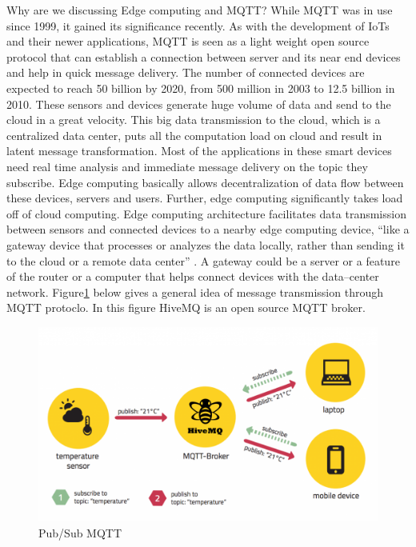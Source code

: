 \documentclass[sigconf]{acmart}
\begin{document}
Why are we discussing Edge computing and MQTT? While MQTT was in use since 1999, it gained its significance recently. As with the development of IoTs and their newer applications, MQTT is seen as a light weight open source protocol that can establish a connection between server and its near end devices and help in quick message delivery. The number of connected devices are expected to reach 50 billion by 2020, from 500 million in 2003 to 12.5 billion in 2010. These sensors and devices generate huge volume of data and send to the cloud in a great velocity. This big data transmission to the cloud, which is a centralized data center, puts all the computation load on cloud and result in latent message transformation. Most of the applications in these smart devices need real time analysis and immediate message delivery on the topic they subscribe. Edge computing basically allows decentralization of data flow between these devices, servers and users. Further, edge computing significantly takes load off of cloud computing. Edge computing architecture facilitates data transmission between sensors and connected devices to a nearby edge computing device, ``like a gateway device that processes or analyzes the data locally, rather than sending it to the cloud or a remote data center'' \cite{www-rtinsights-com}. A gateway could be a server or a feature of the router or a computer that helps connect devices with the data--center network.
Figure\ref{p:Pub/Sub MQTT} below gives a general idea of message transmission through MQTT protoclo. In this figure HiveMQ is an open source MQTT broker. 

\begin{figure}[htb]
\includegraphics[width=1.0\columnwidth]{images/pubsubmqtt.png}
\caption{Pub/Sub MQTT}\label{p:Pub/Sub MQTT}
\end{figure}
\end{document}
